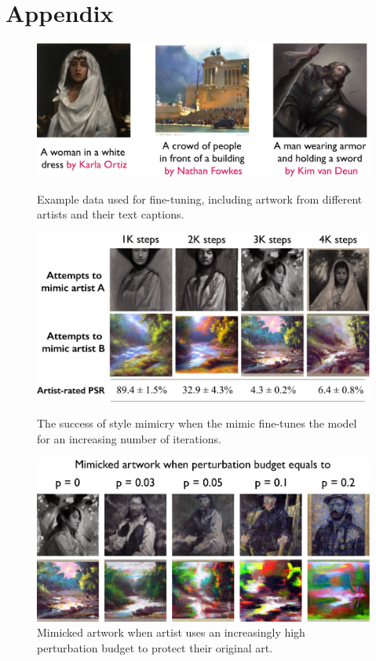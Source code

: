\section{Appendix}
\label{sec:appendix}


\begin{figure}[t]
\centering
  \begin{minipage}{0.31\textwidth}
  \centering
  \includegraphics[width=1\columnwidth]{plots/appendix/example-image-text.pdf}
  \caption{Example data used for fine-tuning, including artwork from different
    artists and their text captions.} 
  \label{fig:data-examples}
  \end{minipage}
\hfill
  \begin{minipage}{0.31\textwidth}
  \centering
  \includegraphics[width=1\columnwidth]{plots/appendix/performace-iterations.pdf}
  \caption{The success of style mimicry when the mimic fine-tunes the model for an increasing number of iterations. }
  \label{fig:success-iter}
  \end{minipage}
\hfill
  \begin{minipage}{0.31\textwidth}
  \centering
  \includegraphics[width=1\columnwidth]{plots/appendix/increase-results.pdf}
  \caption{Mimicked artwork when artist uses an increasingly high
    perturbation budget to protect their original art.} 
  \label{fig:budget2results}
  \end{minipage}
  \hfill


\end{figure}
